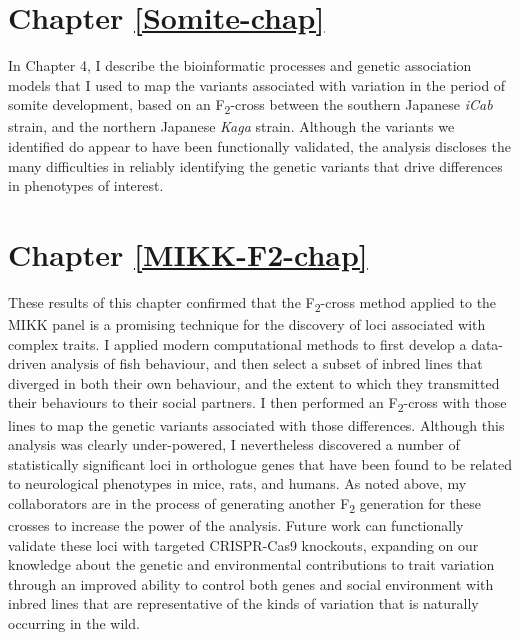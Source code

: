 \documentclass[
]{book}
\begin{document}
\hypertarget{chapter-refsomite-chap}{%
\section*{Chapter \ref{Somite-chap}}\label{chapter-refsomite-chap}}

In Chapter 4, I describe the bioinformatic processes and genetic association models that I used to map the variants associated with variation in the period of somite development, based on an F\textsubscript{2}-cross between the southern Japanese \emph{iCab} strain, and the northern Japanese \emph{Kaga} strain. Although the variants we identified do appear to have been functionally validated, the analysis discloses the many difficulties in reliably identifying the genetic variants that drive differences in phenotypes of interest.

\hypertarget{chapter-refmikk-f2-chap}{%
\section*{Chapter \ref{MIKK-F2-chap}}\label{chapter-refmikk-f2-chap}}

These results of this chapter confirmed that the F\textsubscript{2}-cross method applied to the MIKK panel is a promising technique for the discovery of loci associated with complex traits. I applied modern computational methods to first develop a data-driven analysis of fish behaviour, and then select a subset of inbred lines that diverged in both their own behaviour, and the extent to which they transmitted their behaviours to their social partners. I then performed an F\textsubscript{2}-cross with those lines to map the genetic variants associated with those differences. Although this analysis was clearly under-powered, I nevertheless discovered a number of statistically significant loci in orthologue genes that have been found to be related to neurological phenotypes in mice, rats, and humans. As noted above, my collaborators are in the process of generating another F\textsubscript{2} generation for these crosses to increase the power of the analysis. Future work can functionally validate these loci with targeted CRISPR-Cas9 knockouts, expanding on our knowledge about the genetic and environmental contributions to trait variation through an improved ability to control both genes and social environment with inbred lines that are representative of the kinds of variation that is naturally occurring in the wild.
\end{document}
